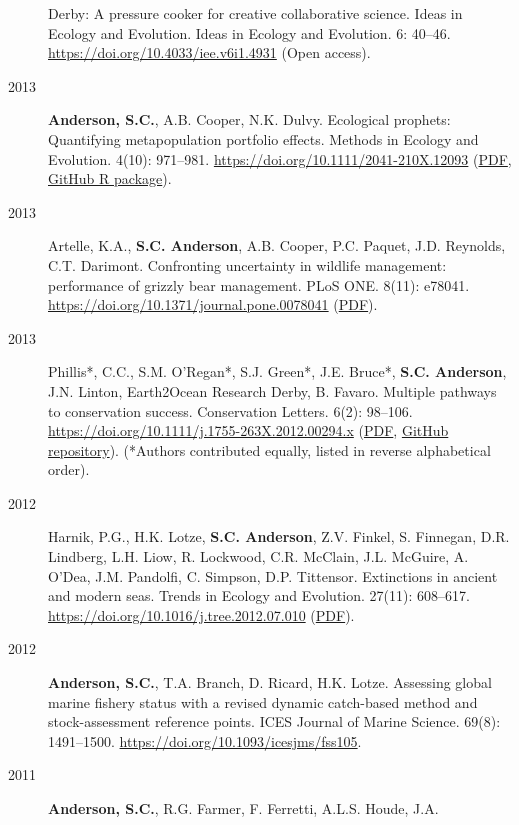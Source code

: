 \begin{description}
Derby: A pressure cooker for creative collaborative science. Ideas in
Ecology and Evolution. Ideas in Ecology and Evolution. 6: 40--46.
\url{https://doi.org/10.4033/iee.v6i1.4931} (Open access).
\item[2013]
\textbf{Anderson, S.C.}, A.B. Cooper, N.K. Dulvy. Ecological prophets:
Quantifying metapopulation portfolio effects. Methods in Ecology and
Evolution. 4(10): 971--981.
\url{https://doi.org/10.1111/2041-210X.12093}
(\href{https://www.dropbox.com/s/7tx1h1pkmmp222j/Anderson_etal_2013_ecological_prophets_with_SOM.pdf?dl=1}{PDF},
\href{https://github.com/seananderson/ecofolio}{GitHub R package}).
\item[2013]
Artelle, K.A., \textbf{S.C. Anderson}, A.B. Cooper, P.C. Paquet, J.D.
Reynolds, C.T. Darimont. Confronting uncertainty in wildlife management:
performance of grizzly bear management. PLoS ONE. 8(11): e78041.
\url{https://doi.org/10.1371/journal.pone.0078041}
(\href{http://www.plosone.org/article/fetchObject.action?uri=info\%3Adoi\%2F10.1371\%2Fjournal.pone.0078041\&representation=PDF}{PDF}).
\item[2013]
Phillis*, C.C., S.M. O'Regan*, S.J. Green*, J.E. Bruce*, \textbf{S.C.
Anderson}, J.N. Linton, Earth2Ocean Research Derby, B. Favaro. Multiple
pathways to conservation success. Conservation Letters. 6(2): 98--106.
\url{https://doi.org/10.1111/j.1755-263X.2012.00294.x}
(\href{https://www.dropbox.com/s/cxt848ng5x4hc4t/Phillis_etal_2012_Multiple_pathways_to_conservation_success.pdf?dl=1}{PDF},
\href{https://github.com/seananderson/conservation_pathways}{GitHub
repository}). (*Authors contributed equally, listed in reverse
alphabetical order).
\item[2012]
Harnik, P.G., H.K. Lotze, \textbf{S.C. Anderson}, Z.V. Finkel, S.
Finnegan, D.R. Lindberg, L.H. Liow, R. Lockwood, C.R. McClain, J.L.
McGuire, A. O'Dea, J.M. Pandolfi, C. Simpson, D.P. Tittensor.
Extinctions in ancient and modern seas. Trends in Ecology and Evolution.
27(11): 608--617. \url{https://doi.org/10.1016/j.tree.2012.07.010}
(\href{https://www.dropbox.com/s/rdn9685viqr37qy/Harnik_etal_2012_Extinctions_in_ancient_and_modern_seas.pdf?dl=1}{PDF}).
\item[2012]
\textbf{Anderson, S.C.}, T.A. Branch, D. Ricard, H.K. Lotze. Assessing
global marine fishery status with a revised dynamic catch-based method
and stock-assessment reference points. ICES Journal of Marine Science.
69(8): 1491--1500. \url{https://doi.org/10.1093/icesjms/fss105}.
\item[2011]
\textbf{Anderson, S.C.}, R.G. Farmer, F. Ferretti, A.L.S. Houde, J.A.

\end{description}
